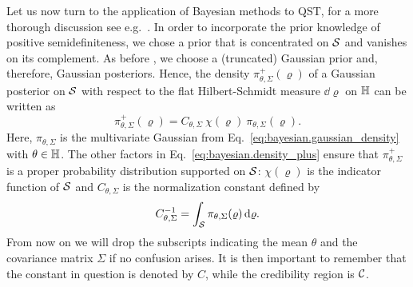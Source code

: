 Let us now turn to the application of Bayesian methods to QST, for a more thorough discussion see e.g.~\cite{Granade_2015_Practical}.
In order to incorporate the prior knowledge of positive semidefiniteness, we chose a prior that is concentrated on $\mathcal{S}$ and vanishes on its complement.
As before%
, we choose a (truncated) Gaussian prior and, therefore, Gaussian posteriors.
Hence, the density $\pi_{\theta,\Sigma}^+(\varrho)$ of a Gaussian posterior on $\mathcal{S}$ with respect to the flat Hilbert-Schmidt measure $\dd\varrho$ on $\mathbb{H}$ can be written as
\begin{equation}
  \label{eq:bayesian.density_plus}
  \pi^+_{\theta,\Sigma}(\varrho) = C_{\theta,\Sigma}\ \chi(\varrho)\ \pi_{\theta,\Sigma}(\varrho).
\end{equation}
Here, $\pi_{\theta,\Sigma}$ is the multivariate Gaussian from Eq.~\eqref{eq:bayesian.gaussian_density} with $\theta \in \mathbb{H}$.
The other factors in Eq.~\eqref{eq:bayesian.density_plus} ensure that $\pi^+_{\theta,\Sigma}$ is a proper probability distribution supported on $\mathcal{S}$:
$\chi(\varrho)$ is the indicator function of $\mathcal{S}$ and $C_{\theta,\Sigma}$ is the normalization constant defined by
\begin{equation}
  C_{\theta,\Sigma}^{-1} = \int_{\mathcal{S}} \pi_{\theta,\Sigma}(\varrho) \,\mathrm{d}\varrho.
\end{equation}
From now on we will drop the subscripts indicating the mean $\theta$ and the covariance matrix $\Sigma$ if no confusion arises. It is then important to remember that the constant in question is denoted by $C$, while the credibility region is $\mathcal{C}$.

